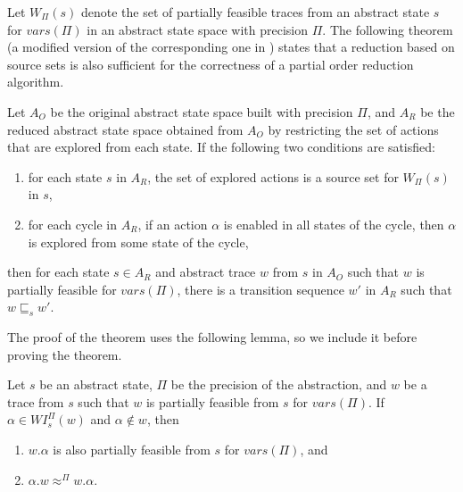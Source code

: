 \documentclass[numbook]{svjour3}
\begin{document}
Let $W_\Pi(s)$ denote the set of partially feasible traces from an abstract state $s$ for $\mathit{vars}(\Pi)$ in an abstract state space with precision $\Pi$. The following theorem (a modified version of the corresponding one in \cite{source_persistent}) states that a reduction based on source sets is also sufficient for the correctness of a partial order reduction algorithm.

\begin{theorem}
	\label{theorem:por-source-sets}
	Let $A_O$ be the original abstract state space built with precision $\Pi$, and $A_R$ be the reduced abstract state space obtained from $A_O$ by restricting the set of actions that are explored from each state. If the following two conditions are satisfied:
	
	\begin{enumerate}
		\item for each state $s$ in $A_R$, the set of explored actions is a source set for $W_\Pi(s)$ in $s$,
		\item for each cycle in $A_R$, if an action $\alpha$ is enabled in all states of the cycle, then $\alpha$ is explored from some state of the cycle,
	\end{enumerate}
	
	then for each state $s \in A_R$ and abstract trace $w$ from $s$ in $A_O$ such that $w$ is partially feasible for $\mathit{vars}(\Pi)$, there is a transition sequence $w'$ in $A_R$ such that $w \sqsubseteq_{s} w'$.
\end{theorem}

The proof of the theorem uses the following lemma, so we include it before proving the theorem.

\begin{lemma}
	\label{lemma:por-weak-initials-partial-feasibility}
	Let $s$ be an abstract state, $\Pi$ be the precision of the abstraction, and $w$ be a trace from $s$ such that $w$ is partially feasible from $s$ for ${vars}(\Pi)$. If $\alpha \in \mathit{WI}_s^\Pi(w)$ and $\alpha \notin w$, then
	
	\begin{enumerate}
		\item $w.\alpha$ is also partially feasible from $s$ for ${vars}(\Pi)$, and
		\item $\alpha.w \approx^\Pi w.\alpha$.
	\end{enumerate}
\end{lemma}
\end{document}
